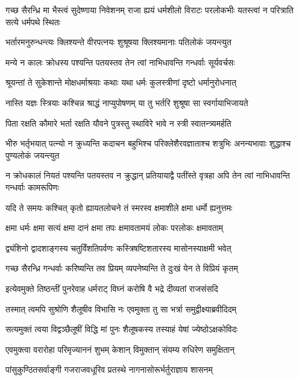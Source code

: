 \threelineshloka
{गच्छ सैरन्ध्रि मा भैस्त्वं सुदेष्णाया निवेशनम्}
{राजा ह्ययं धर्मशीलो विराटः परलोकभीः}
{यतस्त्वां न परित्राति सत्ये धर्मपथे स्थितः}


\twolineshloka
{भर्तारमनुरुन्धन्त्यः क्लिश्यन्ते वीरपत्नयः}
{शुश्रूषया क्लिश्यमानाः पतिलोकं जयन्त्युत}


\twolineshloka
{मन्ये न कालः क्रोधस्य पश्यन्ति पतयस्तव}
{तेन त्वां नाभिधावन्ति गन्धर्वाः सूर्यवर्चसः}


\twolineshloka
{श्रूयन्तां ते सुकेशान्ते मोक्षधर्माश्रयाः कथाः}
{यथा धर्मः कुलस्त्रीणां दृष्टो धर्मानुरोधनात्}


\twolineshloka
{नास्ति यज्ञः स्त्रियाः कश्चिन्न श्राद्धं नाप्युपोषणम्}
{या तु भर्तरि शुश्रूषा सा स्वर्गायाभिजायते}


\twolineshloka
{पिता रक्षति कौमारे भर्ता रक्षति यौवने}
{पुत्रस्तु स्थाविरे भावे न स्त्री स्वातन्त्र्यमर्हति}


\threelineshloka
{भीरु भर्तृभयात् पत्न्यो न क्रुध्यन्ति कदाचन}
{बहुभिश्च परिक्लेशैरवज्ञाताश्च शत्रुभिः}
{अनन्यभावाः शुद्धाश्च पुण्यलोकं जयन्त्युत}


\threelineshloka
{न क्रोधकालं नियतं पश्यन्ति पतयस्तव}
{न क्रुद्धान् प्रतियायाद्वै पतींस्ते वृत्रहा अपि}
{तेन त्वां नाभिधावन्ति गन्धर्वाः कामरूपिणः}


\twolineshloka
{यदि ते समयः कश्चित् कृतो ह्यायतलोचने}
{तं स्मरस्व क्षमाशीले क्षमा धर्मो ह्यनुत्तमः}


\twolineshloka
{क्षमा धर्मः क्षमा सत्यं क्षमा दानं क्षमा तपः}
{क्षमावतामयं लोकः परलोकः क्षमावताम्}


\twolineshloka
{द्व्यंशिनो द्वादशाङ्गस्य चतुर्विंशतिपर्वणः}
{कस्त्रिषष्टिशतारस्य मासोनस्याक्षमी भवेत्}


\twolineshloka
{गच्छ सैरन्ध्रि गन्धर्वाः करिष्यन्ति तव प्रियम्}
{व्यपनेष्यन्ति ते दुःखं येन ते विप्रियं कृतम्}


\twolineshloka
{इत्येवमुक्ते तिष्ठन्तीं पुनरेवाह धर्मराट्}
{विघ्नं करोषि वै भद्रे दीव्यतां राजसंसदि}


\twolineshloka
{तस्मात् त्वमपि सुश्रोणि शैलूषीव विभासि नः}
{एवमुक्ता तु सा भर्त्रा समुद्वीक्ष्याब्रवीदिदम्}


\twolineshloka
{सत्यमुक्तं त्वया विद्वञ्छैलूषीं विद्धि मां पुनः}
{शैलूषकस्य तस्याहं येषां ज्येष्ठोऽक्षकोविदः}


\twolineshloka
{एवमुक्त्वा वरारोहा परिमृज्याननं शुभम्}
{केशान् विमुक्तान् संयम्य रुधिरेण समुक्षितान्}





\twolineshloka
{पांसुकुण्ठितसर्वाङ्गी गजराजवधूरिव}
{प्रतस्थे नागनासोरूर्भर्तुराज्ञाय शासनम्}


